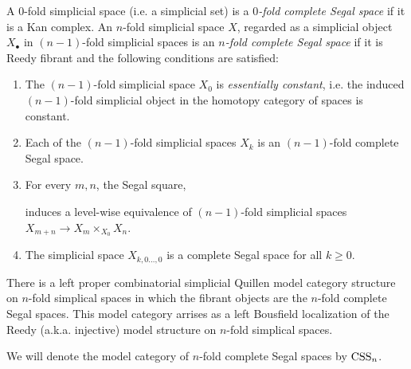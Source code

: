 \documentclass{amsart}
\begin{document}
\begin{definition}
		A $0$-fold simplicial space (i.e. a simplicial set) is a {\em $0$-fold complete Segal space} if it is a Kan complex. An $n$-fold simplicial space $X$, regarded as a simplicial object $X_\bullet$ in $(n-1)$-fold simplicial spaces is an {\em $n$-fold complete Segal space} if it is Reedy fibrant and the following conditions are satisfied:
		\begin{enumerate}
			\item The $(n-1)$-fold simplicial space $X_0$ is {\em essentially constant}, i.e. the induced $(n-1)$-fold simplicial object in the homotopy category of spaces is constant. 
			\item Each of the $(n-1)$-fold simplicial spaces $X_k$ is an $(n-1)$-fold complete Segal space.
			\item For every $m, n$, the Segal square,
			\begin{center}
			\end{center}
			induces a level-wise equivalence of $(n-1)$-fold simplicial spaces $X_{m+n} \to X_m \times_{X_0} X_n$.
			\item The simplicial space $X_{k, 0 \dots, 0}$ is a complete Segal space for all $k\geq 0$. 
		\end{enumerate}
\end{definition}

\begin{theorem}
	There is a left proper combinatorial simplicial Quillen model category structure on $n$-fold simplical spaces in which the fibrant objects are the $n$-fold complete Segal spaces. This model category arrises as a left Bousfield localization of the Reedy (a.k.a. injective) model structure on $n$-fold simplical spaces.
\end{theorem}

\noindent We will denote the model category of $n$-fold complete Segal spaces by $\mathrm{CSS}_n$.  
\end{document}

